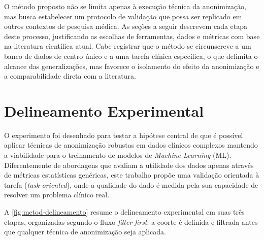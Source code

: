 O método proposto não se limita apenas à execução técnica da anonimização, mas busca estabelecer um protocolo de validação que possa ser replicado em outros contextos de pesquisa médica. As seções a seguir descrevem cada etapa deste processo, justificando as escolhas de ferramentas, dados e métricas com base na literatura científica atual. Cabe registrar que o método se circunscreve a um banco de dados de centro único e a uma tarefa clínica específica, o que delimita o alcance das generalizações, mas favorece o isolamento do efeito da anonimização e a comparabilidade direta com a literatura.

\section{Delineamento Experimental}
\label{sec:metod-delineamento}

O experimento foi desenhado para testar a hipótese central de que é possível aplicar técnicas de anonimização robustas em dados clínicos complexos mantendo a viabilidade para o treinamento de modelos de \textit{Machine Learning} (ML). Diferentemente de abordagens que avaliam a utilidade dos dados apenas através de métricas estatísticas genéricas, este trabalho propõe uma validação orientada à tarefa (\textit{task-oriented}), onde a qualidade do dado é medida pela sua capacidade de resolver um problema clínico real.

A \autoref{fig:metod-delineamento} resume o delineamento experimental em suas três etapas, organizadas segundo o fluxo \textit{filter-first}: a coorte é definida e filtrada antes que qualquer técnica de anonimização seja aplicada.

